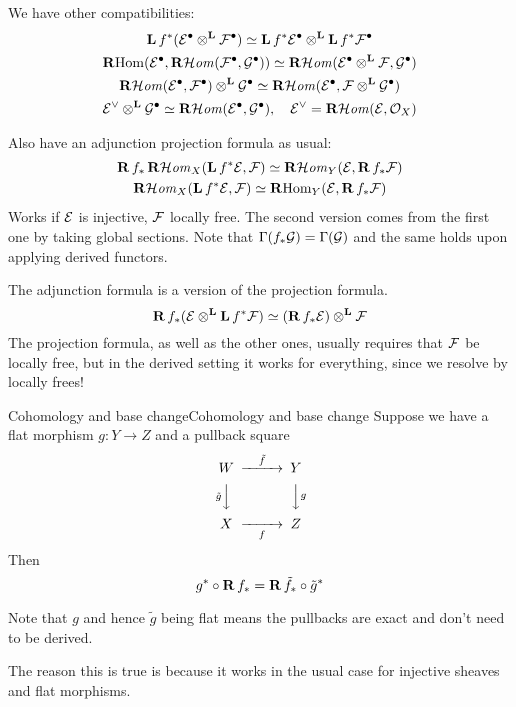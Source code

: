 We have other compatibilities:
$$\begin{gathered} \dL f^*(\calE^\bullet \Lotimes \calF^\bullet)\simeq \dL f^*\calE^\bullet \Lotimes \dL f^* \calF^\bullet \\
\RHom(\calE^\bullet, \RlHom(\calF^\bullet,\calG^\bullet))\simeq \RlHom(\calE^\bullet\Lotimes \calF, \calG^\bullet)\\
\RlHom(\calE^\bullet, \calF^\bullet)\Lotimes \calG^\bullet
\simeq \RlHom(\calE^\bullet, \calF\Lotimes \calG^\bullet)\\
\calE^\vee\Lotimes \calG^\bullet \simeq \RlHom(\calE^\bullet, \calG^\bullet), \quad \calE^\vee = \RlHom(\calE, \O_{X})\end{gathered} $$

Also have an adjunction projection formula as usual:
$$\begin{gathered}
    \dR f_{*}\RlHom_{X}(\dL f^*\calE,\calF)\simeq \RlHom_{Y}(\calE, \dR f_{*}\calF) \\
\RlHom_{X}(\dL f^*\calE, \calF)\simeq \RHom_{Y}(\calE, \dR f_{*}\calF)
\end{gathered}$$
Works if $\calE$ is injective, $\calF$ locally free. The second version comes from the first one by taking global sections. Note that $\Gamma(f_*\calG)=\Gamma(\calG)$ and the same holds upon applying derived functors.

The adjunction formula is a version of the projection formula.
$$\dR f_{*} (\calE\Lotimes \dL f^*\calF)\simeq (\dR f_{* }\calE)\Lotimes \calF$$
The projection formula, as well as the other ones, usually requires that $\calF$ be locally free, but in the derived setting it works for everything, since we resolve by locally frees!

\begin{theorem}{Cohomology and base change}{Cohomology and base change}
    Suppose we have a flat morphism $g:Y\to Z$ and a pullback square $$\begin{CD}W @> \tilde{f}> > Y \\ @V\tilde{g}VV @VVgV \\ X @> >f > Z
    \end{CD}$$
    Then $$g^*\circ\dR f_*=\dR\tilde{f}_*\circ\tilde{g}^*$$
\end{theorem}

Note that $g$ and hence $\tilde g$ being flat means the pullbacks are exact and
don't need to be derived.

The reason this is true is because it works in the usual case for injective sheaves and flat morphisms.

